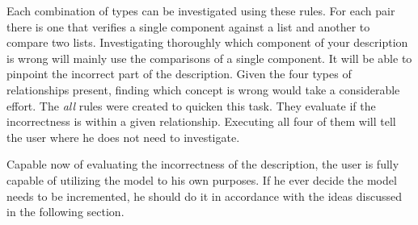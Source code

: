 Each combination of types can be investigated using these rules. For each pair there is one that verifies a single component against a list and another to compare two lists. Investigating thoroughly which component of your description is wrong will mainly use the comparisons of a single component. It will be able to pinpoint the incorrect part of the description. Given the four types of relationships present, finding which concept is wrong would take a considerable effort. The \textit{all} rules were created to quicken this task. They evaluate if the incorrectness is within a given relationship. Executing all four of them will tell the user where he does not need to investigate.

Capable now of evaluating the incorrectness of the description, the user is fully capable of utilizing the model to his own purposes. If he ever decide the model needs to be incremented, he should do it in accordance with the ideas discussed in the following section.